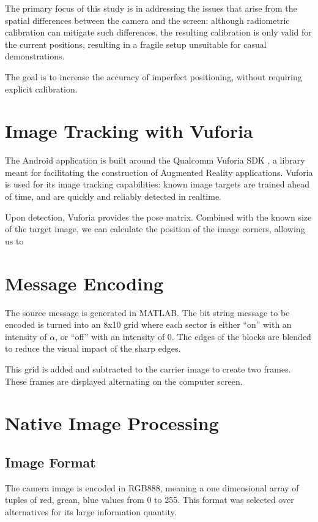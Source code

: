 \documentclass[11pt, letterpaper]{article}
\begin{document}
The primary focus of this study is in addressing the issues that arise from the spatial differences between the camera and the screen: although radiometric calibration can mitigate such differences, the resulting calibration is only valid for the current positions, resulting in a fragile setup unsuitable for casual demonstrations.

The goal is to increase the accuracy of imperfect positioning, without requiring explicit calibration.

\section{Image Tracking with Vuforia}
The Android application is built around the Qualcomm Vuforia SDK \cite{vuforia}, a library meant for facilitating the construction of Augmented Reality applications.
Vuforia is used for its image tracking capabilities: known image targets are trained ahead of time, and are quickly and reliably detected in realtime.

Upon detection,	Vuforia provides the pose matrix. Combined with the known size of the target image, we can calculate the position of the image corners, allowing us to 

\section{Message Encoding}
The source message is generated in MATLAB. The bit string message to be encoded is turned into an 8x10 grid where each sector is either ``on'' with an intensity of $\alpha$, or ``off'' with an intensity of $0$. The edges of the blocks are blended to reduce the visual impact of the sharp edges.

This grid is added and subtracted to the carrier image to create two frames. These frames are displayed alternating on the computer screen.

\section{Native Image Processing}
\subsection{Image Format}
The camera image is encoded in RGB888, meaning a one dimensional array of tuples of red, grean, blue values from 0 to 255.
This format was selected over alternatives for its large information quantity.
\end{document}
